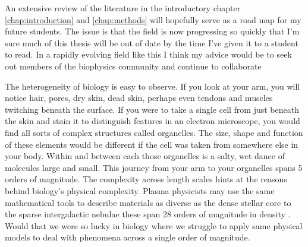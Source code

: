 An extensive review of the literature in the introductory chapter \ref{chap:introduction} and \ref{chap:methods} will hopefully serve as a road map for my future students. The issue is that the field is now progressing so quickly that I'm sure much of this thesis will be out of date by the time I've given it to a student to read. In a rapidly evolving field like this I think my advice would be to seek out members of the biophysics community and continue to collaborate

The heterogeneity of biology is easy to observe. If you look at your arm, you will notice hair, pores, dry skin, dead skin, perhaps even tendons and muscles twitching beneath the surface. If you were to take a single cell from just beneath the skin and stain it to distinguish features in an electron microscope, you would find all sorts of complex structures called organelles. The size, shape and function of these elements would be different if the cell was taken from somewhere else in your body. Within and between each those organelles is a salty, wet dance of molecules large and small. This journey from your arm to your organelles spans 5 orders of magnitude. The complexity across length scales hints at the reasons behind biology's physical complexity. Plasma physicists may use the same mathematical tools to describe materials as diverse as the dense stellar core to the sparse intergalactic nebulae these span 28 orders of magnitude in density \cite{chen2018}. Would that we were so lucky in biology where we struggle to apply same physical models to deal with phenomena across a single order of magnitude.  
